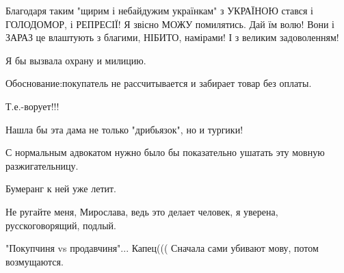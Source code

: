 \begin{itemize}
Благодаря таким "щирим і небайдужим українкам" з УКРАЇНОЮ стався і ГОЛОДОМОР, і
РЕПРЕСІЇ! Я звісно МОЖУ помилятись. Дай їм волю! Вони і ЗАРАЗ це влаштують з
благими, НІБИТО, намірами! І з великим задоволенням!


 

Я бы вызвала охрану и милицию.

Обоснование:покупатель не рассчитывается и забирает товар без оплаты.

Т.е.-ворует!!!

Нашла бы эта дама не только "дрибьязок", но и тургики!

 
С нормальным адвокатом нужно было бы показательно ушатать эту мовную разжигательницу.

 
Бумеранг к ней уже летит.

 
Не ругайте меня, Мирослава, ведь это делает человек, я уверена, русскоговорящий, подлый.

 
"Покупчиня vs продавчиня"... Капец((( Сначала сами убивают мову, потом возмущаются.

\begin{itemize}
 

\end{itemize}
\end{itemize}
